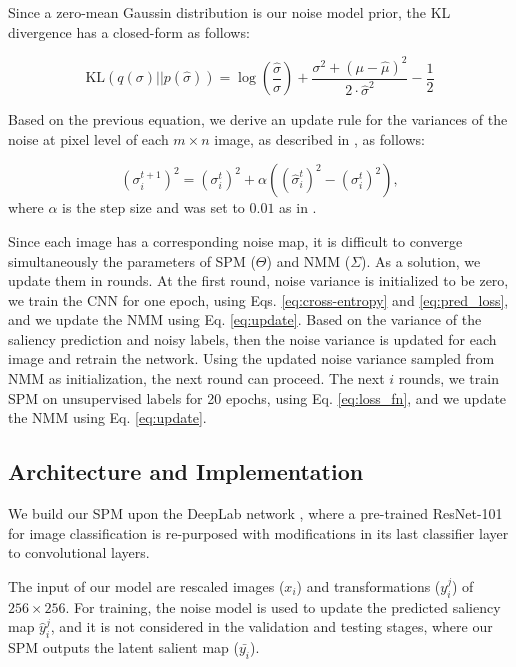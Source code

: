 \documentclass{article}
\begin{document}
Since a zero-mean Gaussin distribution is our noise model prior, the KL divergence has a closed-form as follows:

\begin{equation}
  \mathrm{KL} \left(q(\sigma) || p(\hat{\sigma}) \right) = \log \left( \dfrac{\hat{\sigma}}{\sigma} \right) + \dfrac{\sigma^2 + (\mu - \hat{\mu})^2}{2 \cdot \hat{\sigma}^2} - \dfrac{1}{2}
  \label{eq:kl_closed}
\end{equation}

Based on the previous equation, we derive an update rule for the variances of the noise at pixel level of each $m \times n$ image, as described in \cite{zhang2018}, as follows: 

\begin{equation}
  (\sigma^{t+1}_i)^2 = (\sigma^{t}_i)^2 + \alpha \left( (\hat{\sigma}^t_i)^2 - (\sigma^{t}_i)^2 \right),
  \label{eq:update}
\end{equation}
where $\alpha$ is the step size and was set to $0.01$ as in \cite{zhang2018}.

Since each image has a corresponding noise map, it is difficult to converge simultaneously the parameters of SPM ($\Theta$) and NMM ($\Sigma$). As a solution, we update them in rounds. At the first round, noise variance is initialized to be zero, we train the CNN for one epoch, using Eqs. \eqref{eq:cross-entropy} and \eqref{eq:pred_loss}, and we update the NMM using Eq. \eqref{eq:update}. Based on the variance of the saliency prediction and noisy labels, then the noise variance is updated for each image and retrain the network. Using the updated noise variance sampled from NMM as initialization, the next round can proceed. The next $i$ rounds, we train SPM on unsupervised labels for 20 epochs, using Eq. \eqref{eq:loss_fn}, and we update the NMM using Eq. \eqref{eq:update}.

\subsection{Architecture and Implementation}

We build our SPM upon the DeepLab network \cite{Deeplab}, where a pre-trained ResNet-101 \cite{ResNet101} for image classification is re-purposed with modifications in its last classifier layer to convolutional layers. 

The input of our model are rescaled images ($x_i$) and transformations ($y_i^j$) of $256 \times 256$. For training, the noise model is used to update the predicted saliency map $\hat{y}_i^j$, and it is not considered in the validation and testing stages, where our SPM outputs the latent salient map ($\bar{y_i}$).
\end{document}
